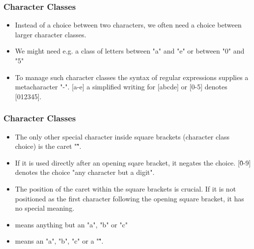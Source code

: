  \begin{frame}[fragile]
\frametitle{Character Classes}

\begin{itemize}
\item Instead of a choice between two characters, we often need a choice between larger character classes. 
\item We might need e.g. a class of letters between "a" and "e" or between "0" and "5"
\item To manage such character classes the syntax of regular expressions supplies a metacharacter "-". [a-e] a simplified writing for [abcde] or [0-5] denotes [012345]. 
\end{itemize}
\end{frame}


 \begin{frame}[fragile]
\frametitle{Character Classes}

\begin{itemize}
\item The only other special character inside square brackets (character class choice) is the caret "\^".
\item  If it is used directly after an opening sqare bracket, it negates the choice. [\^0-9] denotes the choice "any character but a digit". 
\item The position of the caret within the square brackets is crucial. If it is not positioned as the first character following the opening square bracket, it has no special meaning. 
\item [\^abc] means anything but an "a", "b" or "c" 
\item [a\^bc] means an "a", "b", "c" or a "\^". 
\end{itemize}

\end{frame}


